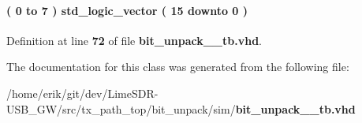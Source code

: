 \paragraph[{smpl\+\_\+16b\+\_\+array\+\_\+type}]{ {\bfseries \textcolor{vhdlchar}{(}\textcolor{vhdlchar}{ }\textcolor{vhdlchar}{ } \textcolor{vhdldigit}{0} \textcolor{vhdlchar}{ }\textcolor{keywordflow}{to}\textcolor{vhdlchar}{ }\textcolor{vhdlchar}{ } \textcolor{vhdldigit}{7} \textcolor{vhdlchar}{ }\textcolor{vhdlchar}{)}\textcolor{vhdlchar}{ }\textcolor{vhdlchar}{ }\textcolor{comment}{std\+\_\+logic\+\_\+vector}\textcolor{vhdlchar}{ }\textcolor{vhdlchar}{(}\textcolor{vhdlchar}{ }\textcolor{vhdlchar}{ } \textcolor{vhdldigit}{15} \textcolor{vhdlchar}{ }\textcolor{keywordflow}{downto}\textcolor{vhdlchar}{ }\textcolor{vhdlchar}{ } \textcolor{vhdldigit}{0} \textcolor{vhdlchar}{ }\textcolor{vhdlchar}{)}\textcolor{vhdlchar}{ }} \hspace{0.3cm}{\ttfamily [Type]}}\label{classbit__unpack__64__tb_1_1tb__behave_a67dbdf4e8d07ac3dee1f799160a740b7}


Definition at line {\bf 72} of file {\bf bit\+\_\+unpack\+\_\+\_\+tb.\+vhd}.



The documentation for this class was generated from the following file\+:\begin{DoxyCompactItemize}
\item 
/home/erik/git/dev/\+Lime\+S\+D\+R-\/\+U\+S\+B\+\_\+\+G\+W/src/tx\+\_\+path\+\_\+top/bit\+\_\+unpack/sim/{\bf bit\+\_\+unpack\+\_\+\_\+tb.\+vhd}\end{DoxyCompactItemize}
